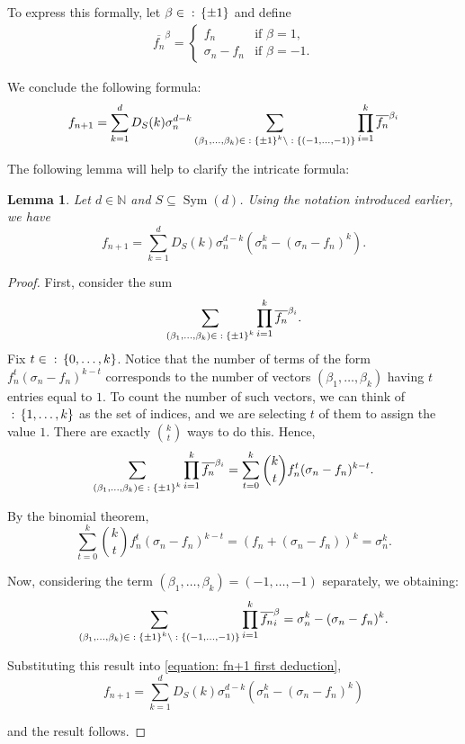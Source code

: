 \documentclass{amsart}
\def\set#1{{\def\st{\;:\;}\left\{#1\right\}}}
\def\NN{\mathbb N}
\DeclareMathOperator{\Sym}{Sym}
\DeclareMathOperator{\st}{st}
\newtheorem{Lemma}[Proposition]{Lemma}
\begin{document}
To express this formally, let $\beta \in \set{\pm 1}$ and define 
\begin{align*}
\overline{f_n}^\beta = \left \{ \begin{matrix} f_n & \mbox{if $\beta = 1$,} \\ 
\sigma_n - f_n & \mbox{if $\beta = -1$.}
\end{matrix}\right.
\end{align*}

We conclude the following formula: 
\begin{equation}
f_{n+1} = \sum_{k = 1}^d D_S(k) \sigma_n^{d-k} \sum_{(\beta_1,\dots,\beta_k) \in \set{\pm 1}^k \setminus \set{(-1,\dots,-1)}} \prod_{i = 1}^k \overline{f_n}^{\beta_i}
\label{equation: fn+1 first deduction}
\end{equation}

The following lemma will help to clarify the intricate formula:

\begin{Lemma}
\label{lemma: formula fn+1}
Let $d \in \NN$ and $S \subseteq \Sym(d)$. Using the notation introduced earlier, we have
\begin{equation}
f_{n+1} = \sum_{k = 1}^d D_S(k) \sigma_n^{d-k} (\sigma_n^k - (\sigma_n - f_n)^k).
\label{equation: fn+1 second deduction}
\end{equation}
\end{Lemma}

\begin{proof}
First, consider the sum $$\sum_{(\beta_1,\dots,\beta_k) \in \set{\pm 1}^k} \prod_{i = 1}^k \overline{f_n}^{\beta_i}.$$ Fix $t \in \set{0,\dots,k}$. Notice that the number of terms of the form $f_n^t (\sigma_n - f_n)^{k-t}$ corresponds to the number of vectors $(\beta_1,\dots,\beta_k)$ having $t$ entries equal to $1$. To count the number of such vectors, we can think of $\set{1,\dots,k}$ as the set of indices, and we are selecting $t$ of them to assign the value $1$. There are exactly $\binom{k}{t}$ ways to do this. Hence, $$\sum_{(\beta_1,\dots,\beta_k) \in \set{\pm 1}^k} \prod_{i = 1}^k \overline{f_n}^{\beta_i} = \sum_{t = 0}^k \binom{k}{t} f_n^t(\sigma_n - f_n)^{k-t}.$$

By the binomial theorem, $$\sum_{t = 0}^k \binom{k}{t} f_n^t(\sigma_n - f_n)^{k-t} = (f_n + (\sigma_n - f_n))^k = \sigma_n^k.$$

Now, considering the term $(\beta_1,\dots,\beta_k) = (-1,\dots,-1)$ separately, we obtaining: 
$$\sum_{(\beta_1,\dots,\beta_k) \in \set{\pm 1}^k \setminus \set{(-1,\dots,-1)}} \prod_{i = 1}^k \overline{f_n}^\beta_i = \sigma_n^k - (\sigma_n - f_n)^k.$$

Substituting this result into \cref{equation: fn+1 first deduction},
$$f_{n+1} = \sum_{k = 1}^d D_S(k) \sigma_n^{d-k} (\sigma_n^k - (\sigma_n - f_n)^k)$$

and the result follows.
\end{proof}
\end{document}

